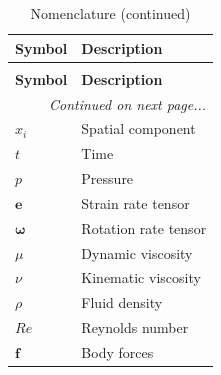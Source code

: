 \documentclass[12pt, a4paper, twoside, openright]{book}
\begin{document}
\begin{longtable}{p{} p{}}

	\toprule
	\textbf{Symbol}                              & \textbf{Description}                                                         \\
	\midrule
	\endfirsthead

	\caption[]{Nomenclature (continued)}                                                                                        \\
	\toprule
	\textbf{Symbol}                              & \textbf{Description}                                                         \\
	\midrule
	\endhead

	\midrule
	\multicolumn{2}{r}{\textit{Continued on next page...}}                                                                      \\
	\endfoot

	\bottomrule
	\endlastfoot

	$x_i$                                        & Spatial component                                                            \\
	$t$                                          & Time                                                                         \\
	$p$                                          & Pressure                                                                     \\
	$\bm{e}$                                     & Strain rate tensor                                                           \\
	$\bm{\omega}$                                & Rotation rate tensor                                                         \\
	$\mu$                                        & Dynamic viscosity                                                            \\
	$\nu$                                        & Kinematic viscosity                                                          \\
	$\rho$                                       & Fluid density                                                                \\
	$Re$                                         & Reynolds number                                                              \\
	$\bm{f}$									 & Body forces\\


\end{longtable}
\end{document}
